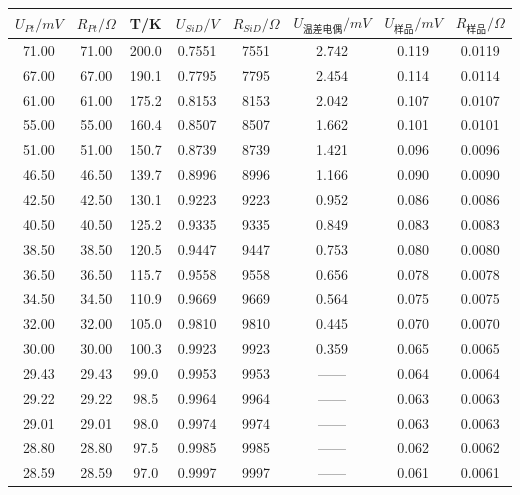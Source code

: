 \documentclass{article}
\begin{document}
    \begin{table}[htbp]
        \centering
        \begin{tabular}{cccccccc}
            \toprule
            $U_{Pt}/mV$ & $R_{Pt}/\Omega$ & T/K  & $U_{SiD}/V$ & $R_{SiD}/\Omega$ & $U_{\text{温差电偶}}/mV$ & $U_{\text{样品}}/mV$ & $R_{\text{样品}}/\Omega$ \\
            \midrule
            71.00  & 71.00  & 200.0  & 0.7551  & 7551  & 2.742  & 0.119  & 0.0119  \\
            67.00  & 67.00  & 190.1  & 0.7795  & 7795  & 2.454  & 0.114  & 0.0114  \\
            61.00  & 61.00  & 175.2  & 0.8153  & 8153  & 2.042  & 0.107  & 0.0107  \\
            55.00  & 55.00  & 160.4  & 0.8507  & 8507  & 1.662  & 0.101  & 0.0101  \\
            51.00  & 51.00  & 150.7  & 0.8739  & 8739  & 1.421  & 0.096  & 0.0096  \\
            46.50  & 46.50  & 139.7  & 0.8996  & 8996  & 1.166  & 0.090  & 0.0090  \\
            42.50  & 42.50  & 130.1  & 0.9223  & 9223  & 0.952  & 0.086  & 0.0086  \\
            \midrule
            40.50  & 40.50  & 125.2  & 0.9335  & 9335  & 0.849 & 0.083  & 0.0083  \\
            38.50  & 38.50  & 120.5  & 0.9447  & 9447  & 0.753 & 0.080  & 0.0080  \\
            36.50  & 36.50  & 115.7  & 0.9558  & 9558  & 0.656 & 0.078  & 0.0078  \\
            34.50  & 34.50  & 110.9  & 0.9669  & 9669  & 0.564 & 0.075  & 0.0075  \\
            32.00  & 32.00  & 105.0  & 0.9810  & 9810  & 0.445 & 0.070  & 0.0070  \\
            30.00  & 30.00  & 100.3  & 0.9923  & 9923  & 0.359 & 0.065  & 0.0065  \\
            \midrule
            29.43  & 29.43  & 99.0  & 0.9953  & 9953  & ——    & 0.064  & 0.0064  \\
            29.22  & 29.22  & 98.5  & 0.9964  & 9964  & ——    & 0.063  & 0.0063  \\
            29.01  & 29.01  & 98.0  & 0.9974  & 9974  & ——    & 0.063 & 0.0063  \\
            28.80  & 28.80  & 97.5  & 0.9985  & 9985  & ——    & 0.062  & 0.0062  \\
            28.59  & 28.59  & 97.0  & 0.9997  & 9997  & ——    & 0.061  & 0.0061  \\

\end{tabular}
\end{table}
\end{document}
